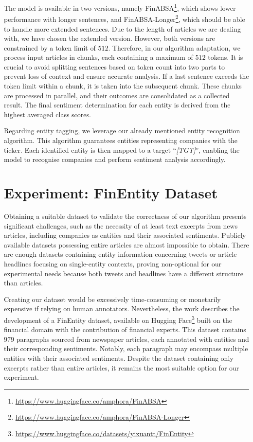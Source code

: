 The model is available in two versions, namely FinABSA\footnote{\href{https://www.huggingface.co/amphora/FinABSA}{https://www.huggingface.co/amphora/FinABSA}}, which shows lower performance with longer sentences, and FinABSA-Longer\footnote{\href{https://www.huggingface.co/amphora/FinABSA-Longer}{https://www.huggingface.co/amphora/FinABSA-Longer}}, which should be able to handle more extended sentences. Due to the length of articles we are dealing with, we have chosen the extended version. However, both versions are constrained by a token limit of $512$. Therefore, in our algorithm adaptation, we process input articles in chunks, each containing a maximum of $512$ tokens. It is crucial to avoid splitting sentences based on token count into two parts to prevent loss of context and ensure accurate analysis. If a last sentence exceeds the token limit within a chunk, it is taken into the subsequent chunk. These chunks are processed in parallel, and their outcomes are consolidated as a collected result. The final sentiment determination for each entity is derived from the highest averaged class scores.

Regarding entity tagging, we leverage our already mentioned entity recognition algorithm. This algorithm guarantees entities representing companies with the ticker. Each identified entity is then mapped to a target ``\textit{[TGT]}'', enabling the model to recognise companies and perform sentiment analysis accordingly.

\section{Experiment: FinEntity Dataset}
\label{sec:elsa-experiment-finentity-dataset}
Obtaining a suitable dataset to validate the correctness of our algorithm presents significant challenges, such as the necessity of at least text excerpts from news articles, including companies as entities and their associated sentiments. Publicly available datasets possessing entire articles are almost impossible to obtain. There are enough datasets containing entity information concerning tweets or article headlines focusing on single-entity contexts, proving non-optional for our experimental needs because both tweets and headlines have a different structure than articles.

Creating our dataset would be excessively time-consuming or monetarily expensive if relying on human annotators. Nevertheless, the work \parencite{tang-etal-2023-finentity} describes the development of a FinEntity dataset, available on Hugging Face\footnote{\href{https://www.huggingface.co/datasets/yixuantt/FinEntity}{https://www.huggingface.co/datasets/yixuantt/FinEntity}} built on the financial domain with the contribution of financial experts. This dataset contains $979$ paragraphs sourced from newspaper articles, each annotated with entities and their corresponding sentiments. Notably, each paragraph may encompass multiple entities with their associated sentiments. Despite the dataset containing only excerpts rather than entire articles, it remains the most suitable option for our experiment.

